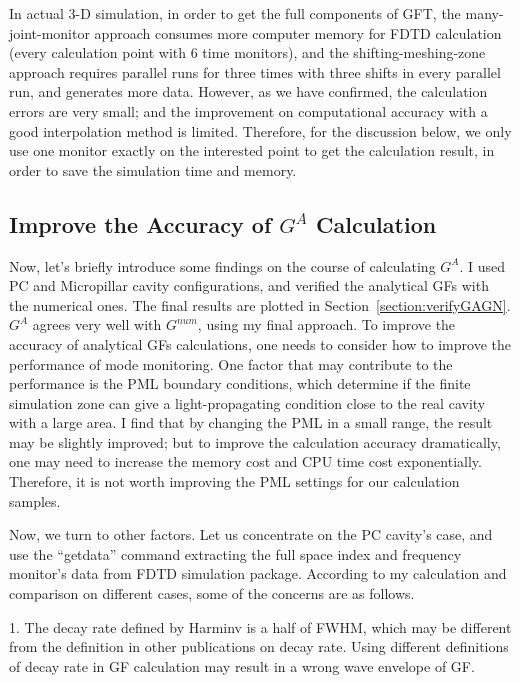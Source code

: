 In actual 3-D simulation, in order to get the full components of GFT, the many-joint-monitor approach consumes more computer memory for FDTD calculation (every calculation point with 6 time monitors), and the shifting-meshing-zone approach requires parallel runs for three times with three shifts in every parallel run, and generates more data. However, as we have confirmed, the calculation errors are very small; and the improvement on computational accuracy with a good interpolation method is limited. Therefore, for the discussion below, we only use one monitor exactly on the interested point to get the calculation result, in order to save the simulation time and memory.




\subsection{Improve the Accuracy of $G^{A}$ Calculation}

Now, let's briefly introduce some findings on the course of calculating $G^{A}$. I used PC and Micropillar cavity configurations, and verified the analytical GFs with the numerical ones. The final results are plotted in Section~\ref{section:verifyGAGN}. $G^{A}$ agrees very well with $G^{num}$, using my final approach. To improve the accuracy of analytical GFs calculations, one needs to consider how to improve the performance of mode monitoring. One factor that may contribute to the performance is the PML boundary conditions, which determine if the finite simulation zone can give a light-propagating condition close to the real cavity with a large area. I find that by changing the PML in a small range, the result may be slightly improved; but to improve the calculation accuracy dramatically, one may need to increase the memory cost and CPU time cost exponentially. Therefore, it is not worth improving the PML settings for our calculation samples.

Now, we turn to other factors. Let us concentrate on the PC cavity's case, and use the ``getdata'' command extracting the full space index and frequency monitor's data from FDTD simulation package. According to my calculation and comparison on different cases, some of the concerns are as follows.

1. The decay rate defined by Harminv is a half of FWHM, which may be different from the definition in other publications on decay rate. Using different definitions of decay rate in GF calculation may result in a wrong wave envelope of GF.

